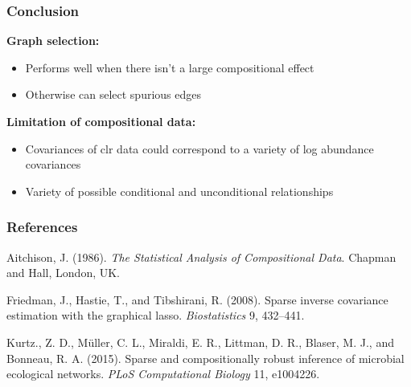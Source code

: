 \documentclass{beamer}
\begin{document}
\begin{frame}
\frametitle{Conclusion}
\textbf{Graph selection:}
\begin{itemize}
\item Performs well when there isn't a large compositional effect
\item Otherwise can select spurious edges
\end{itemize}

\textbf{Limitation of compositional data:}
\begin{itemize}
\item Covariances of clr data could correspond to a variety of log abundance covariances
\item Variety of possible conditional and unconditional relationships
\end{itemize}
\end{frame}

\begin{frame}
\frametitle{References}
Aitchison, J. (1986). \textit{The Statistical Analysis of Compositional Data}. Chapman and Hall, London, UK.

Friedman, J., Hastie, T., and Tibshirani, R. (2008). Sparse inverse covariance estimation with the graphical lasso. \textit{Biostatistics} 9, 432--441.

Kurtz., Z. D., M{\"u}ller, C. L., Miraldi, E. R., Littman, D. R., Blaser, M. J., and Bonneau, R. A. (2015). Sparse and compositionally robust inference of microbial ecological networks. \textit{PLoS Computational Biology} 11, e1004226.
\end{frame}
\end{document}

